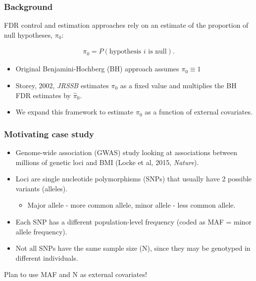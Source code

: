 \documentclass{beamer}
\begin{document}

\begin{frame}
\frametitle{Background}

FDR control and estimation approaches rely on an estimate of the proportion of null hypotheses, $\pi_0$:

\begin{eqnarray*}
\pi_0 = P(\mbox{hypothesis $i$ is null}).
\end{eqnarray*}

\begin{itemize}
\item Original Benjamini-Hochberg (BH) approach assumes $\pi_0 \equiv 1$
\item Storey, 2002, \textit{JRSSB} estimates $\pi_0$ as a fixed value and multiplies the BH FDR estimates by $\hat{\pi}_0$.
\item We expand this framework to estimate $\pi_0$ as a function of external covariates.
\end{itemize}


\end{frame}


\begin{frame}
\frametitle{Motivating case study}

\begin{itemize}
\item Genome-wide association ({\color{red}GWAS}) study looking at associations between millions of genetic loci and BMI (Locke et al, 2015, \textit{Nature}).
\item Loci are single nucleotide polymorphisms (SNPs) that usually have 2 possible variants (alleles).
\begin{itemize}
\item Major allele - more common allele, minor allele - less common allele.
\end{itemize}
\item Each SNP has a different population-level frequency (coded as {\color{red}MAF = minor allele frequency}).
\item Not all SNPs have the same sample size ({\color{red}N}), since they may be genotyped in different individuals.
\end{itemize}

\vspace{0.5cm}Plan to use MAF and N as external covariates!

\end{frame}
\end{document}
